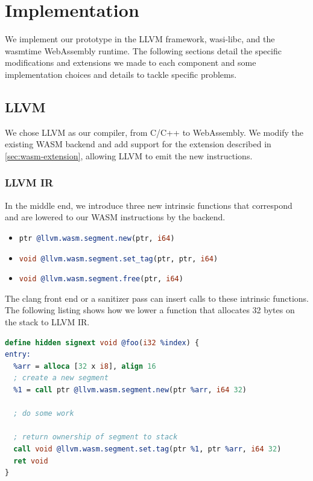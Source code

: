 \chapter{Implementation}
\label{ch:implementation}

We implement our prototype in the LLVM framework, wasi-libc, and the wasmtime WebAssembly runtime.
The following sections detail the specific modifications and extensions we made to each component and some implementation choices and details to tackle specific problems.

\section{LLVM}
\label{sec:llvm}

We chose LLVM as our compiler, from C/C++ to WebAssembly.
We modify the existing \ac{WASM} backend and add support for the extension described in \cref{sec:wasm-extension}, allowing LLVM to emit the new instructions.

\subsection{LLVM IR}
\label{subsec:llvm-ir}

In the middle end, we introduce three new intrinsic functions that correspond and are lowered to our \ac{WASM} instructions by the backend.

\begin{itemize}
  \item \lstinline[style=customc,language=llvm]{ptr @llvm.wasm.segment.new(ptr, i64)}
  \item \lstinline[style=customc,language=llvm]{void @llvm.wasm.segment.set_tag(ptr, ptr, i64)}
  \item \lstinline[style=customc,language=llvm]{void @llvm.wasm.segment.free(ptr, i64)}
\end{itemize}

The clang front end or a sanitizer pass can insert calls to these intrinsic functions.
The following listing shows how we lower a function that allocates 32 bytes on the stack to LLVM IR.

\begin{lstlisting}[frame=h,style=customc,
  label={lst:llvm-intrinsics},language=llvm]
define hidden signext void @foo(i32 %index) {
entry:
  %arr = alloca [32 x i8], align 16
  ; create a new segment
  %1 = call ptr @llvm.wasm.segment.new(ptr %arr, i64 32)

  ; do some work

  ; return ownership of segment to stack
  call void @llvm.wasm.segment.set.tag(ptr %1, ptr %arr, i64 32)
  ret void
}
\end{lstlisting}

